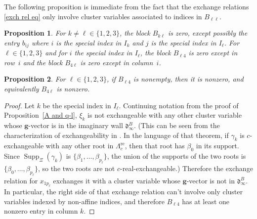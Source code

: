 \documentclass[10pt]{article}
\newtheorem{proposition}{Proposition}[section]
\theoremstyle{definition}
\theoremstyle{remark}
\numberwithin{equation}{section}
\newcommand{\set}[1]{{\lbrace #1 \rbrace}}
\newcommand{\0}{{\mathbf{0}}}
\newcommand{\g}{\mathbf{g}}
\newcommand{\re}{\mathrm{re}}
\renewcommand{\d}{{\mathfrak d}}
\newcommand{\SimplesTChar}{\Xi}
\newcommand{\SuppT}{\operatorname{Supp}_\SimplesTChar}
\newcommand{\APTChar}{\Lambda}
\newcommand{\APT}[1]{\APTChar_{#1}}
\newcommand{\APTre}[1]{\APT{#1}^\re}
\begin{document}
The following proposition is immediate from the fact that the exchange relations \eqref{exch rel eq} only involve cluster variables associated to indices in $B_{\ell\ell}$.

\begin{proposition}\label{mostly zeros}
For  $k\neq\ell\in\set{1,2,3}$, the block $B_{k\ell}$ is zero, except possibly the entry $b_{ij}$ where $i$ is the special index in $I_k$ and $j$ is the special index in $I_\ell$.
For $\ell\in\set{1,2,3}$ and for $i$ the special index in $I_\ell$, the block $B_{\ell4}$ is zero except in row~$i$ and the block $B_{4\ell}$ is zero except in column~$i$.
\end{proposition}

\begin{proposition}\label{not all zeros}
For $\ell\in\set{1,2,3}$, if $B_{\ell4}$ is nonempty, then it is nonzero, and equivalently $B_{4\ell}$ is nonzero.
\end{proposition}
\begin{proof}
Let $k$ be the special index in $I_\ell$.
Continuing notation from the proof of Proposition~\ref{A and q-l}, $\xi_k$ is not exchangeable with any other cluster variable whose $\g$-vector is in the imaginary wall $\d^B_\infty$.
(This can be seen from the characterization of exchangeability in \cite[Theorem~7.2]{affdenom}.
In the language of that theorem, if $\gamma_k$ is $c$-exchangeable with any other root in $\APTre{c}$, then that root has $\beta_0$ in its support.
Since $\SuppT(\gamma_k)$ is $\set{\beta_1,\ldots,\beta_{p_\ell}}$, the union of the supports of the two roots is $\set{\beta_0,\ldots,\beta_{p_\ell}}$, so the two roots are not $c$-real-exchangeable.)
Therefore the exchange relation for $x_{1p_\ell}$ exchanges it with a cluster variable whose $\g$-vector is not in $\d^B_\infty$.  
In particular, the right side of that exchange relation can't involve only cluster variables indexed by non-affine indices, and therefore $B_{\ell4}$ has at least one nonzero entry in column $k$.
\end{proof}
\end{document}
